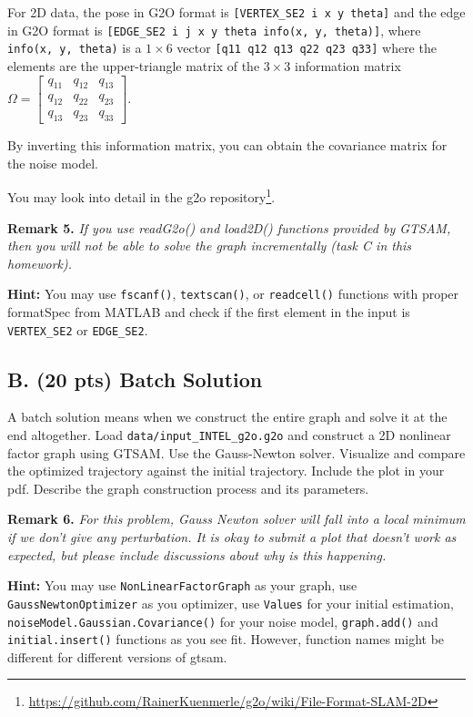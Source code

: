 \documentclass[tp]{lcc}
\begin{document}
For 2D data, the pose in G2O format is \texttt{[VERTEX\_SE2 i x y theta]} and the edge in G2O format is \texttt{[EDGE\_SE2 i j x y theta info(x, y, theta)]}, where \texttt{info(x, y, theta)} is a $1 \times 6$ vector \texttt{[q11 q12 q13 q22 q23 q33]} where the elements are the upper-triangle matrix of the $3 \times 3$ information matrix $\Omega = \begin{bmatrix} q_{11} & q_{12} & q_{13} \\ q_{12} & q_{22} & q_{23} \\ q_{13} & q_{23} & q_{33} \end{bmatrix}$.

By inverting this information matrix, you can obtain the covariance matrix for the noise model.

You may look into detail in the g2o repository\footnote{\url{https://github.com/RainerKuenmerle/g2o/wiki/File-Format-SLAM-2D}}.

\textbf{Remark 5.} \textit{If you use readG2o() and load2D() functions provided by GTSAM, then you will not be able to solve the graph incrementally (task C in this homework).}

\textbf{Hint:} You may use \texttt{fscanf()}, \texttt{textscan()}, or \texttt{readcell()} functions with proper formatSpec from MATLAB and check if the first element in the input is \texttt{VERTEX\_SE2} or \texttt{EDGE\_SE2}.

\subsection{B. (20 pts) Batch Solution}
A batch solution means when we construct the entire graph and solve it at the end altogether. Load \texttt{data/input\_INTEL\_g2o.g2o} and construct a 2D nonlinear factor graph using GTSAM. Use the Gauss-Newton solver. Visualize and compare the optimized trajectory against the initial trajectory. Include the plot in your pdf. Describe the graph construction process and its parameters.

\textbf{Remark 6.} \textit{For this problem, Gauss Newton solver will fall into a local minimum if we don't give any perturbation. It is okay to submit a plot that doesn't work as expected, but please include discussions about why is this happening.}

\textbf{Hint:} You may use \texttt{NonLinearFactorGraph} as your graph, use \texttt{GaussNewtonOptimizer} as you optimizer, use \texttt{Values} for your initial estimation, \texttt{noiseModel.Gaussian.Covariance()} for your noise model, \texttt{graph.add()} and \texttt{initial.insert()} functions as you see fit. However, function names might be different for different versions of gtsam.
\end{document}
